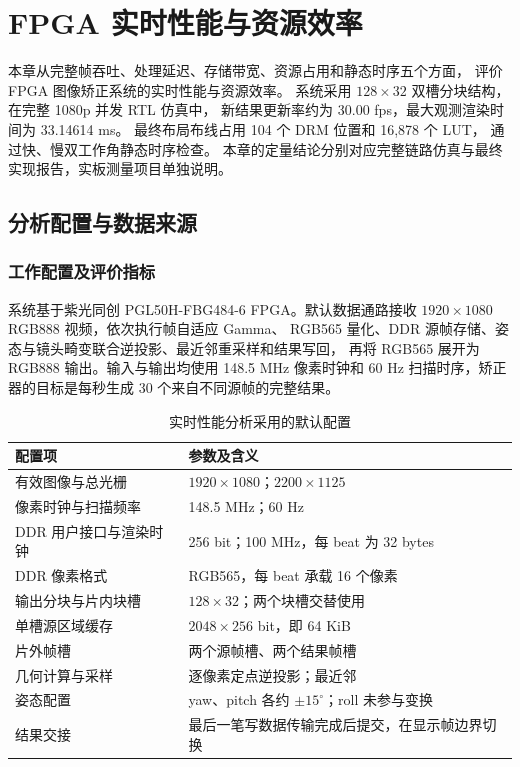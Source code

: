 \chapter{FPGA 实时性能与资源效率}
\label{chap:verification}

本章从完整帧吞吐、处理延迟、存储带宽、资源占用和静态时序五个方面，
评价 FPGA 图像矫正系统的实时性能与资源效率。
系统采用 $128\times32$ 双槽分块结构，在完整 1080p 并发 RTL 仿真中，
新结果更新率约为 30.00 fps，最大观测渲染时间为 33.14614 ms。
最终布局布线占用 104 个 DRM 位置和 16,878 个 LUT，
通过快、慢双工作角静态时序检查。
本章的定量结论分别对应完整链路仿真与最终实现报告，实板测量项目单独说明。

\section{分析配置与数据来源}
\subsection{工作配置及评价指标}
系统基于紫光同创 PGL50H-FBG484-6 FPGA。默认数据通路接收
$1920\times1080$ RGB888 视频，依次执行帧自适应 Gamma、
RGB565 量化、DDR 源帧存储、姿态与镜头畸变联合逆投影、最近邻重采样和结果写回，
再将 RGB565 展开为 RGB888 输出。输入与输出均使用 148.5 MHz 像素时钟和
60 Hz 扫描时序，矫正器的目标是每秒生成 30 个来自不同源帧的完整结果。

\begin{table}[htbp]
\centering\small
\caption{实时性能分析采用的默认配置}\label{tab:rt-config}
\begin{tabularx}{\textwidth}{p{4.4cm}Y}
\toprule
配置项 & 参数及含义 \\
\midrule
有效图像与总光栅 & $1920\times1080$；$2200\times1125$ \\
像素时钟与扫描频率 & 148.5 MHz；60 Hz \\
DDR 用户接口与渲染时钟 & 256 bit；100 MHz，每 beat 为 32 bytes \\
DDR 像素格式 & RGB565，每 beat 承载 16 个像素 \\
输出分块与片内块槽 & $128\times32$；两个块槽交替使用 \\
单槽源区域缓存 & $2048\times256$ bit，即 64 KiB \\
片外帧槽 & 两个源帧槽、两个结果帧槽 \\
几何计算与采样 & 逐像素定点逆投影；最近邻 \\
姿态配置 & yaw、pitch 各约 $\pm15^\circ$；roll 未参与变换 \\
结果交接 & 最后一笔写数据传输完成后提交，在显示帧边界切换 \\
\bottomrule
\end{tabularx}
\end{table}

